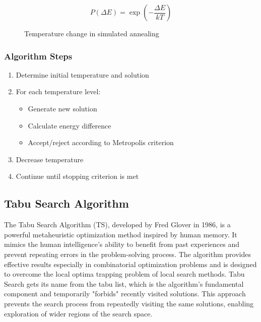 \begin{equation}
P(\Delta E) = \exp\left(-\frac{\Delta E}{kT}\right)
\end{equation}

\begin{figure}[h]
\centering
{}
\caption{Temperature change in simulated annealing}
\label{fig:sa_temp}
\end{figure}

\subsubsection{Algorithm Steps}
\begin{enumerate}
    \item Determine initial temperature and solution
    \item For each temperature level:
        \begin{itemize}
            \item Generate new solution
            \item Calculate energy difference
            \item Accept/reject according to Metropolis criterion
        \end{itemize}
    \item Decrease temperature
    \item Continue until stopping criterion is met
\end{enumerate}

\subsection{Tabu Search Algorithm}
The Tabu Search Algorithm (TS), developed by Fred Glover in 1986, is a powerful metaheuristic optimization method inspired by human memory. It mimics the human intelligence's ability to benefit from past experiences and prevent repeating errors in the problem-solving process. The algorithm provides effective results especially in combinatorial optimization problems and is designed to overcome the local optima trapping problem of local search methods. Tabu Search gets its name from the tabu list, which is the algorithm's fundamental component and temporarily "forbids" recently visited solutions. This approach prevents the search process from repeatedly visiting the same solutions, enabling exploration of wider regions of the search space.

